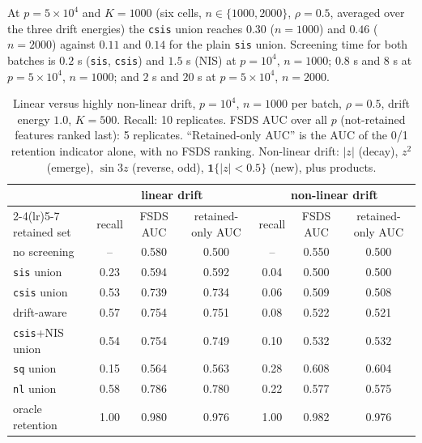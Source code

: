 At $p=5\times10^4$ and $K=1000$ (six cells, $n\in\{1000,2000\}$, $\rho=0.5$, averaged over the three drift energies) the \texttt{csis} union reaches $0.30$ ($n=1000$) and $0.46$ ($n=2000$) against $0.11$ and $0.14$ for the plain \texttt{sis} union. Screening time for both batches is $0.2$ s (\texttt{sis}, \texttt{csis}) and $1.5$ s (NIS) at $p=10^4$, $n=1000$; $0.8$ s and $8$ s at $p=5\times10^4$, $n=1000$; and $2$ s and $20$ s at $p=5\times10^4$, $n=2000$.

\begin{table}[h]
\centering
\caption{Linear versus highly non-linear drift, $p=10^4$, $n=1000$ per batch, $\rho=0.5$, drift energy $1.0$, $K=500$. Recall: 10 replicates. FSDS AUC over all $p$ (not-retained features ranked last): 5 replicates. ``Retained-only AUC'' is the AUC of the 0/1 retention indicator alone, with no FSDS ranking. Non-linear drift: $|z|$ (decay), $z^2$ (emerge), $\sin 3z$ (reverse, odd), $\mathbf 1\{|z|<0.5\}$ (new), plus products.}
\label{tab:nonlinear}
\small
\begin{tabular}{lcccccc}
\toprule
 & \multicolumn{3}{c}{linear drift} & \multicolumn{3}{c}{non-linear drift} \\
\cmidrule(lr){2-4}\cmidrule(lr){5-7}
retained set & recall & FSDS AUC & retained-only AUC & recall & FSDS AUC & retained-only AUC \\
\midrule
no screening           & --   & 0.580 & 0.500 & --   & 0.550 & 0.500 \\
\texttt{sis} union     & 0.23 & 0.594 & 0.592 & 0.04 & 0.500 & 0.500 \\
\texttt{csis} union    & 0.53 & 0.739 & 0.734 & 0.06 & 0.509 & 0.508 \\
drift-aware            & 0.57 & 0.754 & 0.751 & 0.08 & 0.522 & 0.521 \\
\texttt{csis}+NIS union & 0.54 & 0.754 & 0.749 & 0.10 & 0.532 & 0.532 \\
\texttt{sq} union      & 0.15 & 0.564 & 0.563 & 0.28 & 0.608 & 0.604 \\
\texttt{nl} union      & 0.58 & 0.786 & 0.780 & 0.22 & 0.577 & 0.575 \\
oracle retention       & 1.00 & 0.980 & 0.976 & 1.00 & 0.982 & 0.976 \\
\bottomrule
\end{tabular}
\end{table}

